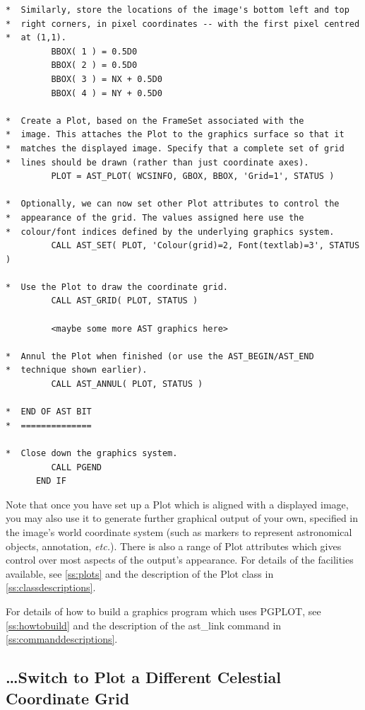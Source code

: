 \documentclass[twoside,11pt]{article}
\newcommand{\htmlref}[2]{#1}
\newcommand{\appref}[1]{Appendix~\ref{#1}}
\newcommand{\secref}[1]{\S\ref{#1}}
\renewcommand{\appref}[1]{\ref{#1}}
\renewcommand{\secref}[1]{\ref{#1}}
\begin{document}
\begin{verbatim}
*  Similarly, store the locations of the image's bottom left and top
*  right corners, in pixel coordinates -- with the first pixel centred
*  at (1,1).
         BBOX( 1 ) = 0.5D0
         BBOX( 2 ) = 0.5D0
         BBOX( 3 ) = NX + 0.5D0
         BBOX( 4 ) = NY + 0.5D0

*  Create a Plot, based on the FrameSet associated with the
*  image. This attaches the Plot to the graphics surface so that it
*  matches the displayed image. Specify that a complete set of grid
*  lines should be drawn (rather than just coordinate axes).
         PLOT = AST_PLOT( WCSINFO, GBOX, BBOX, 'Grid=1', STATUS )

*  Optionally, we can now set other Plot attributes to control the
*  appearance of the grid. The values assigned here use the
*  colour/font indices defined by the underlying graphics system.
         CALL AST_SET( PLOT, 'Colour(grid)=2, Font(textlab)=3', STATUS )

*  Use the Plot to draw the coordinate grid.
         CALL AST_GRID( PLOT, STATUS )

         <maybe some more AST graphics here>

*  Annul the Plot when finished (or use the AST_BEGIN/AST_END
*  technique shown earlier).
         CALL AST_ANNUL( PLOT, STATUS )

*  END OF AST BIT
*  ==============

*  Close down the graphics system.
         CALL PGEND
      END IF
\end{verbatim}
\normalsize

Note that once you have set up a \htmlref{Plot}{Plot} which is aligned with a
displayed image, you may also use it to generate further graphical
output of your own, specified in the image's world coordinate system
(such as markers to represent astronomical objects, annotation,
{\em{etc.}}). There is also a range of Plot attributes which gives
control over most aspects of the output's appearance.  For details of
the facilities available, see \secref{ss:plots} and the description of
the Plot class in \appref{ss:classdescriptions}.

For details of how to build a graphics program which uses PGPLOT, see
\secref{ss:howtobuild} and the description of the \htmlref{ast\_link}{ast_link} command in
\appref{ss:commanddescriptions}.

\subsection{\label{ss:howtoswitchgrid}\ldots Switch to Plot a Different Celestial Coordinate Grid}
\end{document}

